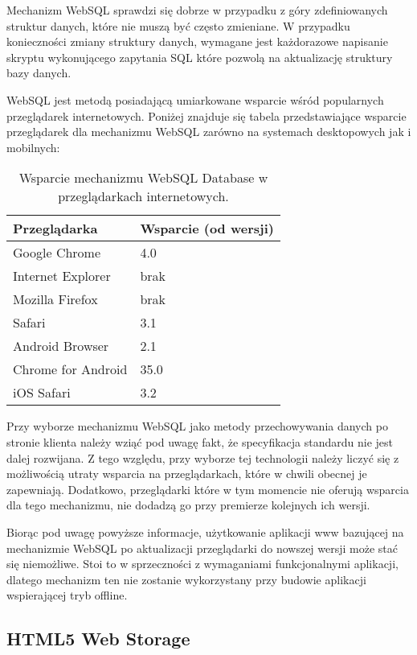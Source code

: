 Mechanizm WebSQL sprawdzi się dobrze w przypadku z góry zdefiniowanych struktur danych, które nie muszą być często zmieniane. W przypadku konieczności zmiany struktury danych, wymagane jest każdorazowe napisanie skryptu wykonującego zapytania SQL które pozwolą na aktualizację struktury bazy danych.

WebSQL jest metodą posiadającą umiarkowane wsparcie wśród popularnych przeglądarek internetowych. Poniżej znajduje się tabela przedstawiające wsparcie przeglądarek dla mechanizmu WebSQL zarówno na systemach desktopowych jak i mobilnych:

\begin{table}[h]
\centering
    \begin{tabular}{ | p{8cm} | p{6cm} | }
    \hline
    \textbf{Przeglądarka} & \textbf{Wsparcie (od wersji)} \\ \hline
	Google Chrome & 4.0
	\\ \hline
	Internet Explorer & brak
	\\ \hline
	Mozilla Firefox & brak
	\\ \hline
	Safari & 3.1
	\\ \hline
	Android Browser & 2.1
	\\ \hline
	Chrome for Android & 35.0
	\\ \hline
	iOS Safari & 3.2
	\\ \hline
    \end{tabular}
	\caption{Wsparcie mechanizmu WebSQL Database w przeglądarkach internetowych.}
\end{table}

Przy wyborze mechanizmu WebSQL jako metody przechowywania danych po stronie klienta należy wziąć pod uwagę fakt, że specyfikacja standardu nie jest dalej rozwijana. Z tego względu, przy wyborze tej technologii należy liczyć się z możliwością utraty wsparcia na przeglądarkach, które w chwili obecnej je zapewniają. Dodatkowo, przeglądarki które w tym momencie nie oferują wsparcia dla tego mechanizmu, nie dodadzą go przy premierze kolejnych ich wersji.

Biorąc pod uwagę powyższe informacje, użytkowanie aplikacji www bazującej na mechanizmie \mbox{WebSQL} po aktualizacji przeglądarki do nowszej wersji może stać się niemożliwe. Stoi to w sprzeczności z wymaganiami funkcjonalnymi aplikacji, dlatego mechanizm ten nie zostanie wykorzystany przy budowie aplikacji wspierającej tryb offline.

\subsection{HTML5 Web Storage}
\label{sec:html5WebStorage}

